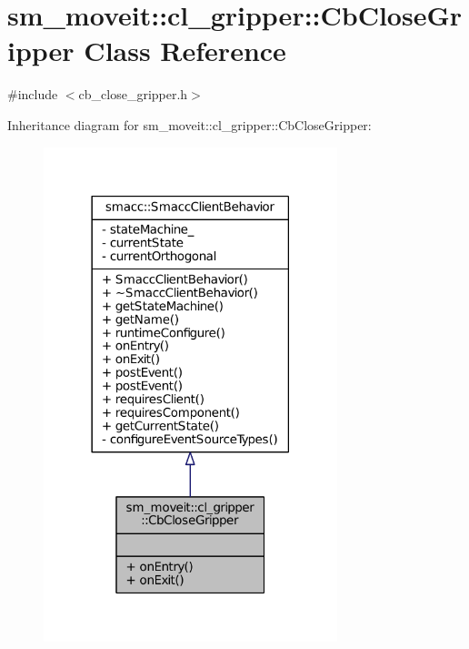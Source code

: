 \hypertarget{classsm__moveit_1_1cl__gripper_1_1CbCloseGripper}{}\section{sm\+\_\+moveit\+:\+:cl\+\_\+gripper\+:\+:Cb\+Close\+Gripper Class Reference}
\label{classsm__moveit_1_1cl__gripper_1_1CbCloseGripper}


{\ttfamily \#include $<$cb\+\_\+close\+\_\+gripper.\+h$>$}



Inheritance diagram for sm\+\_\+moveit\+:\+:cl\+\_\+gripper\+:\+:Cb\+Close\+Gripper\+:
\nopagebreak
\begin{figure}[H]
\begin{center}
\leavevmode
\includegraphics[width=242pt]{classsm__moveit_1_1cl__gripper_1_1CbCloseGripper__inherit__graph}
\end{center}
\end{figure}


